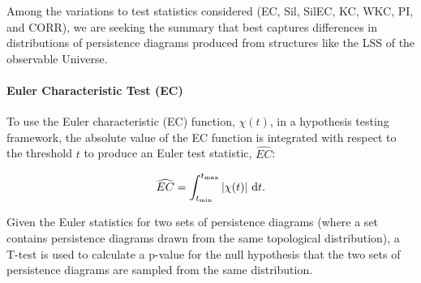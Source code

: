 \documentclass[12pt]{article}
\begin{document}
Among the variations to test statistics considered (EC, Sil, SilEC, KC, WKC, PI, and CORR), we are seeking the summary that best captures differences in distributions of persistence diagrams produced from structures like the LSS of the observable Universe.  

\paragraph{Euler Characteristic Test (EC)}
To use the Euler characteristic (EC) function, $\chi(t)$, in a hypothesis testing framework, the absolute value of the EC function is integrated with respect to the threshold $t$ to produce an Euler test statistic, $\widehat{EC}$:

\begin{equation*}
\widehat{EC} = \int_{t_{\min}}^{t_{\max}} | \chi(t) | \textup{ d}t.
\end{equation*}

Given the Euler statistics for two sets of persistence diagrams (where a set contains persistence diagrams drawn from the same topological distribution), a T-test is used to calculate a p-value for the null hypothesis that the two sets of persistence diagrams are sampled from the same distribution. 
\end{document}
